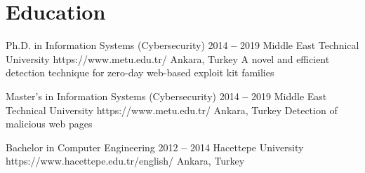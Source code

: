 
\section{Education}


    \itemizeCVBegin[nolabel]{}
    
        \bTitleYearOrgLinkPlace
            {Ph.D. in Information Systems (Cybersecurity)}
            {2014 \textbf{--} 2019}
            {Middle East Technical University}
            {https://www.metu.edu.tr/}
            {Ankara, Turkey}
            \small A novel and efficient detection technique for zero-day web-based exploit kit families
            
        \bTitleYearOrgLinkPlace
            {Master’s in Information Systems (Cybersecurity)}
            {2014 \textbf{--} 2019}
            {Middle East Technical University}
            {https://www.metu.edu.tr/}
            {Ankara, Turkey}
            \small Detection of malicious web pages

        \bTitleYearOrgLinkPlace
            {Bachelor in Computer Engineering}
            {2012 \textbf{--} 2014}
            {Hacettepe University}
            {https://www.hacettepe.edu.tr/english/}
            {Ankara, Turkey}
            
    \itemizeCVEnd

